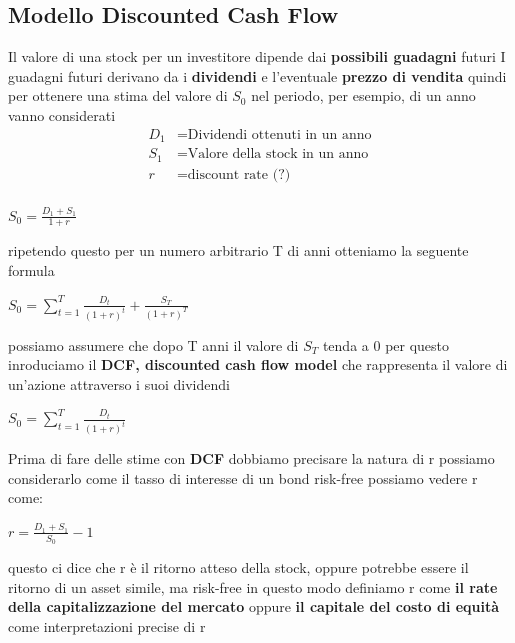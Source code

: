 \documentclass[a4paper,11pt]{report}
\begin{document}
{\subsection{Modello Discounted Cash Flow}
	Il valore di una stock per un investitore dipende dai \textbf{possibili guadagni} futuri \newline
	I guadagni futuri derivano da i \textbf{dividendi} e l'eventuale \textbf{prezzo di vendita} \newline
	quindi per ottenere una stima del valore di $S_0$ nel periodo, per esempio, di un anno vanno considerati
\begin{align*}
	\text{$D_1$} &= \text{Dividendi ottenuti in un anno}\\
	\text{$S_1$} &= \text{Valore della stock in un anno}\\
	r &= \text{discount rate (?)}\\
\end{align*}
\begin{center}
	$S_0={\frac{D_1+S_1}{1+r}}$
\end{center}
	 ripetendo questo per un numero arbitrario T di anni otteniamo la seguente formula
\begin{center}
	$S_0 =\sum\limits_{t=1}^T {\frac {D_t}{(1+r)^t}}+{\frac {S_T}{(1+r)^T}}$
\end{center}	
	possiamo assumere che dopo T anni il valore di $S_T$ tenda a 0  \newline
	per questo inroduciamo il \textbf{DCF, discounted cash flow model} che rappresenta il valore di un'azione attraverso i suoi 		dividendi
\begin{center}
	$S_0 =\sum\limits_{t=1}^T {\frac {D_t}{(1+r)^t}}$
\end{center}
	Prima di fare delle stime con \textbf{DCF} dobbiamo precisare la natura di r \newline
	possiamo considerarlo come il tasso di interesse di un bond risk-free \newline
	possiamo vedere r come:
\begin{center}
	$r={\frac {D_1 + S_1}{S_0}}-1$
\end{center}
	questo ci dice che r è il ritorno %
	atteso della stock, oppure potrebbe essere il ritorno di un asset simile, ma risk-free \newline
	in questo modo definiamo r come \textbf{il rate della capitalizzazione del mercato} oppure \textbf{il capitale del costo di 			equità} come interpretazioni precise di r

\newpage 

}
\end{document}

